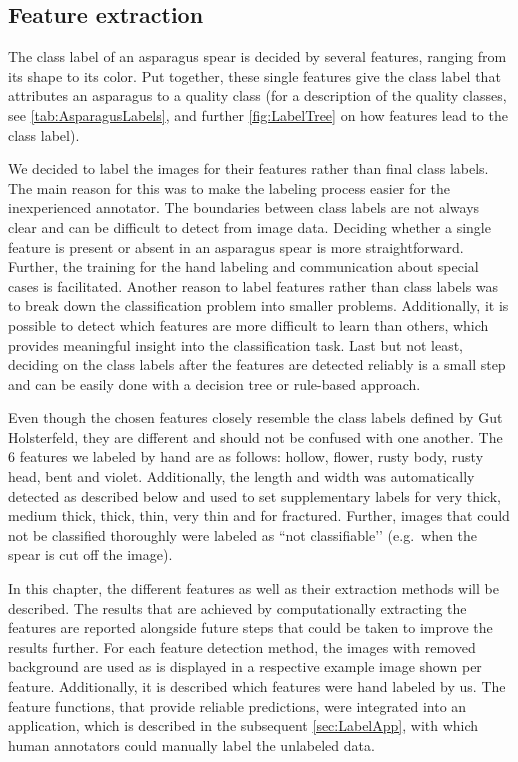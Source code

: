 \newpage

\subsection{Feature extraction}
\label{sec:AutomaticFeatureExtraction}

The class label of an asparagus spear is decided by several features, ranging from its shape to its color. Put together, these single features give the class label that attributes an asparagus to a quality class (for a description of the quality classes, see \autoref{tab:AsparagusLabels}, and further \autoref{fig:LabelTree} on how features lead to the class label).

\bigskip
We decided to label the images for their features rather than final class labels. The main reason for this was to make the labeling process easier for the inexperienced annotator. The boundaries between class labels are not always clear and can be difficult to detect from image data. Deciding whether a single feature is present or absent in an asparagus spear is more straightforward. Further, the training for the hand labeling and communication about special cases is facilitated. Another reason to label features rather than class labels was to break down the classification problem into smaller problems. Additionally, it is possible to detect which features are more difficult to learn than others, which provides meaningful insight into the classification task. Last but not least, deciding on the class labels after the features are detected reliably is a small step and can be easily done with a decision tree or rule-based approach.

Even though the chosen features closely resemble the class labels defined by Gut Holsterfeld, they are different and should not be confused with one another. The 6 features we labeled by hand are as follows: hollow, flower, rusty body, rusty head, bent and violet. Additionally, the length and width was automatically detected as described below and used to set supplementary labels for very thick, medium thick, thick, thin, very thin and for fractured. Further, images that could not be classified thoroughly were labeled as ``not classifiable’’ (e.g.\ when the spear is cut off the image).

\bigskip
In this chapter, the different features as well as their extraction methods will be described. The results that are achieved by computationally extracting the features  are reported alongside future steps that could be taken to improve the results further. For each feature detection method, the images with removed background are used as is displayed in a respective example image shown per feature. Additionally, it is described which features were hand labeled by us. The feature functions, that provide reliable predictions, were integrated into an application, which is described in the subsequent \autoref{sec:LabelApp}, with which human annotators could manually label the unlabeled data.


